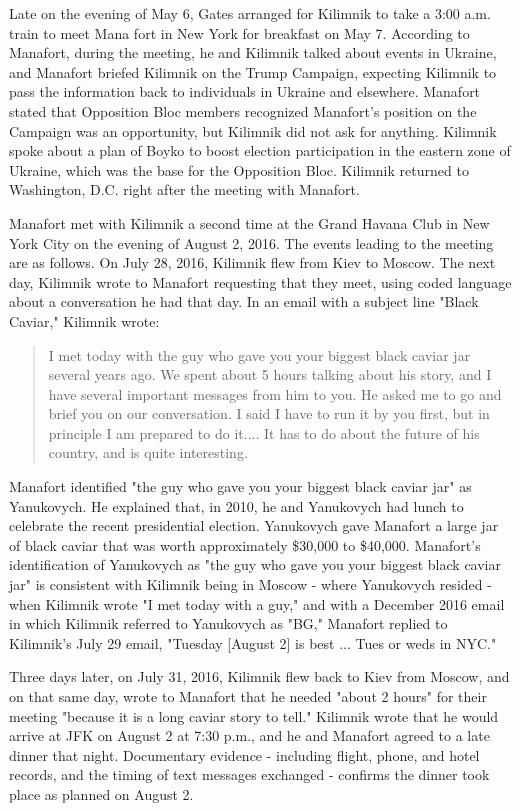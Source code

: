 Late on the evening of May 6, Gates arranged for Kilimnik to take a 3:00 a.m. train to meet Mana fort in New York for breakfast on May 7. %
According to Manafort, during the meeting, he and Kilimnik talked about events in Ukraine, and Manafort briefed Kilimnik on the Trump Campaign, expecting Kilimnik to pass the information back to individuals in Ukraine and elsewhere.%
Manafort stated that Opposition Bloc members recognized Manafort's position on the Campaign was an opportunity, but Kilimnik did not ask for anything.%
Kilimnik spoke about a plan of Boyko to boost election participation in the eastern zone of Ukraine, which was the base for the Opposition Bloc.%
Kilimnik returned to Washington, D.C. right after the meeting with Manafort.

Manafort met with Kilimnik a second time at the Grand Havana Club in New York City on the evening of August 2, 2016.
The events leading to the meeting are as follows.
On July 28, 2016, Kilimnik flew from Kiev to Moscow.%
The next day, Kilimnik wrote to Manafort requesting that they meet, using coded language about a conversation he had that day.%
In an email with a subject line "Black Caviar," Kilimnik wrote:

\begin{quote}
I met today with the guy who gave you your biggest black caviar jar several years ago.
We spent about 5 hours talking about his story, and I have several important messages from him to you.
He asked me to go and brief you on our conversation.
I said I have to run it by you first, but in principle I am prepared to do it....
It has to do about the future of his country, and is quite interesting.%
\end{quote}

Manafort identified "the guy who gave you your biggest black caviar jar" as Yanukovych.
He explained that, in 2010, he and Yanukovych had lunch to celebrate the recent presidential election.
Yanukovych gave Manafort a large jar of black caviar that was worth approximately \$30,000 to \$40,000.%
Manafort's identification of Yanukovych as "the guy who gave you your biggest black caviar jar" is consistent with Kilimnik being in Moscow - where Yanukovych resided - when Kilimnik wrote "I met today with a guy," and with a December 2016 email in which Kilimnik referred to Yanukovych as "BG,"
Manafort replied to Kilimnik's July 29 email, "Tuesday [August 2] is best ... Tues or weds in NYC."%

Three days later, on July 31, 2016, Kilimnik flew back to Kiev from Moscow, and on that same day, wrote to Manafort that he needed "about 2 hours" for their meeting "because it is a long caviar story to tell."%
Kilimnik wrote that he would arrive at JFK on August 2 at 7:30 p.m., and he and Manafort agreed to a late dinner that night.%
Documentary evidence - including flight, phone, and hotel records, and the timing of text messages exchanged%
- confirms the dinner took place as planned on August 2.%

